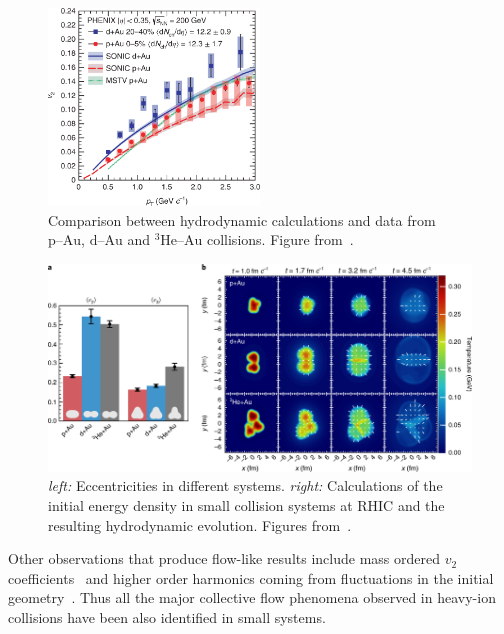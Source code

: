 \begin{figure}[htb]
\centering

		\includegraphics[width=0.5\textwidth]{figures/41567_2018_360_Fig4_HTML.png}
                \caption{Comparison between hydrodynamic calculations and data from $\mbox{p--Au}$, $\mbox{d--Au}$ and $^3\mbox{He--Au}$ collisions. Figure from~\cite{PHENIX:2018lia}.}
	\label{fig:smallsystems1}
\end{figure}

\begin{figure}[b!]
\centering
            	\includegraphics[width=\textwidth]{figures/PhenixNature_1.png}
	\caption{\emph{left:} Eccentricities in different systems. \emph{right:} Calculations of the initial energy density in small collision systems at RHIC and the resulting hydrodynamic evolution. Figures from~\cite{PHENIX:2018lia}.}
	\label{fig:smallhydro}
	\end{figure}


Other observations that produce flow-like results include mass ordered $v_2$ coefficients~\cite{CMS:2018rfr} and higher order harmonics coming from fluctuations in the initial geometry~\cite{Acharya:2017ino}. Thus all the major collective flow phenomena observed in heavy-ion collisions have been also identified in small systems.


